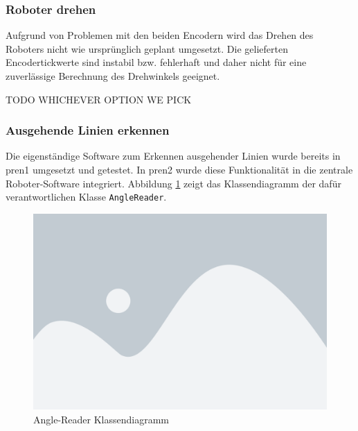 \subsubsection{Roboter drehen}

Aufgrund von Problemen mit den beiden Encodern wird das Drehen des Roboters nicht wie ursprünglich geplant umgesetzt. Die gelieferten Encodertickwerte sind instabil bzw. fehlerhaft und daher nicht für eine zuverlässige Berechnung des Drehwinkels geeignet. 

TODO WHICHEVER OPTION WE PICK



\subsubsection{Ausgehende Linien erkennen}
\label{outgoing-lines}

Die eigenständige Software zum Erkennen ausgehender Linien wurde bereits in \acrshort{pren1} umgesetzt und getestet. In \acrshort{pren2} wurde diese Funktionalität in die zentrale Roboter-Software integriert. Abbildung \ref{fig:angle-reader-classdiagramm} zeigt das Klassendiagramm der dafür verantwortlichen Klasse \verb|AngleReader|.

\begin{figure}[H]
    \centering
    \includegraphics[width=1\linewidth]{assets/placeholder.png}
    \caption{Angle-Reader Klassendiagramm}
    \label{fig:angle-reader-classdiagramm}
\end{figure}

